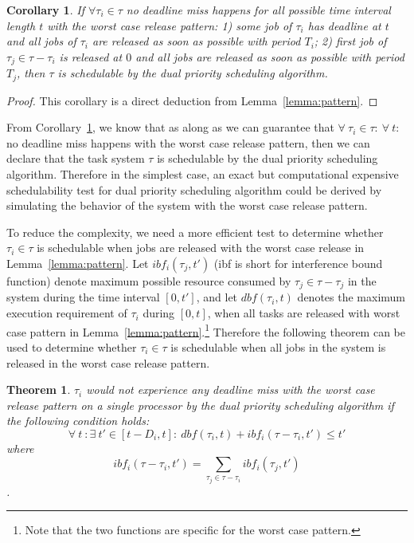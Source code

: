 \documentclass[12pt,conference,twocolumn]{IEEEtran}
\newtheorem{theorem}{Theorem}
\newtheorem{proof}{Proof}
\newtheorem{corollary}{Corollary}
\begin{document}
{\begin{corollary}
\label{corollary:condition}
If  $\forall \tau_i\in \tau$ no deadline miss happens for all possible time interval length $t$ with the worst case release pattern:  1) some job of $\tau_i$ has deadline at $t$  and all jobs of $\tau_i$ are released as soon as possible  with period $T_i$; 2) first job of $\tau_j\in \tau-\tau_i$ is released at $0$ and all jobs are released as soon as possible with period $T_j$, then $\tau$ is schedulable by the dual priority scheduling algorithm.
\end{corollary}
\begin{proof}
This corollary is a direct deduction from Lemma~\ref{lemma:pattern}.
\end{proof}


From Corollary~\ref{corollary:condition}, we know  that as along as we can guarantee that $\forall~\tau_i\in \tau:~\forall~t:$ no deadline miss happens with the worst case release pattern,  then we can declare that the task system $\tau$ is schedulable by the dual priority scheduling algorithm. Therefore  in the simplest case,  an exact but computational expensive schedulability test for dual priority scheduling algorithm could be derived by simulating the behavior of the system with the worst case release pattern. 


To reduce the complexity, we need a more efficient test to determine whether $\tau_i\in\tau$ is schedulable when jobs are released with the worst case release in Lemma~\ref{lemma:pattern}. Let $ibf_i(\tau_j,t')$ (ibf is short for interference bound function) denote maximum possible resource consumed by $\tau_j\in\tau-\tau_j$ in the system  during the time interval $[0,t']$, and let $dbf(\tau_i,t)$ denotes the maximum execution requirement of $\tau_i$ during $[0,t]$,  when all tasks are released with worst case pattern in Lemma~\ref{lemma:pattern}.\footnote{Note that the two functions are specific for the worst case pattern.}  Therefore the following theorem can be used to determine whether $\tau_i\in \tau$ is schedulable when all jobs in the system is released in the worst case release pattern.
}
\begin{theorem}
\label{theorem:1}
$\tau_i$ would not experience any deadline miss with the worst case release pattern on a single processor by the dual priority scheduling algorithm if the following condition holds:
\begin{equation}
\label{eq:1}
\forall~t~:\exists~t'\in[t-D_i, t]:~dbf(\tau_i,t)+ibf_i(\tau-\tau_i,t')\leq t'
\end{equation} 
where \[ibf_i(\tau-\tau_i,t')=\sum_{\tau_j\in \tau-\tau_i}ibf_i(\tau_j,t')\].
\end{theorem}
\end{document}
